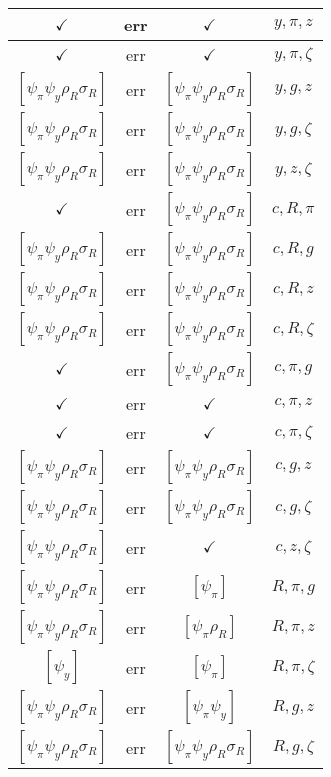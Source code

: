 \documentclass[a4paper,10pt]{article}
\begin{document}
\begin{longtable}{|c|c|c|c|}
\hline
$\checkmark$ & err & $\checkmark$ & ${y},{\pi},{z}$ \\
\hline
$\checkmark$ & err & $\checkmark$ & ${y},{\pi},{\zeta}$ \\
\hline
$[\psi_\pi \psi_y \rho_R \sigma_R ]$ & err & $[\psi_\pi \psi_y \rho_R \sigma_R ]$ & ${y},{g},{z}$ \\
\hline
$[\psi_\pi \psi_y \rho_R \sigma_R ]$ & err & $[\psi_\pi \psi_y \rho_R \sigma_R ]$ & ${y},{g},{\zeta}$ \\
\hline
$[\psi_\pi \psi_y \rho_R \sigma_R ]$ & err & $[\psi_\pi \psi_y \rho_R \sigma_R ]$ & ${y},{z},{\zeta}$ \\
\hline
$\checkmark$ & err & $[\psi_\pi \psi_y \rho_R \sigma_R ]$ & ${c},{R},{\pi}$ \\
\hline
$[\psi_\pi \psi_y \rho_R \sigma_R ]$ & err & $[\psi_\pi \psi_y \rho_R \sigma_R ]$ & ${c},{R},{g}$ \\
\hline
$[\psi_\pi \psi_y \rho_R \sigma_R ]$ & err & $[\psi_\pi \psi_y \rho_R \sigma_R ]$ & ${c},{R},{z}$ \\
\hline
$[\psi_\pi \psi_y \rho_R \sigma_R ]$ & err & $[\psi_\pi \psi_y \rho_R \sigma_R ]$ & ${c},{R},{\zeta}$ \\
\hline
$\checkmark$ & err & $[\psi_\pi \psi_y \rho_R \sigma_R ]$ & ${c},{\pi},{g}$ \\
\hline
$\checkmark$ & err & $\checkmark$ & ${c},{\pi},{z}$ \\
\hline
$\checkmark$ & err & $\checkmark$ & ${c},{\pi},{\zeta}$ \\
\hline
$[\psi_\pi \psi_y \rho_R \sigma_R ]$ & err & $[\psi_\pi \psi_y \rho_R \sigma_R ]$ & ${c},{g},{z}$ \\
\hline
$[\psi_\pi \psi_y \rho_R \sigma_R ]$ & err & $[\psi_\pi \psi_y \rho_R \sigma_R ]$ & ${c},{g},{\zeta}$ \\
\hline
$[\psi_\pi \psi_y \rho_R \sigma_R ]$ & err & $\checkmark$ & ${c},{z},{\zeta}$ \\
\hline
$[\psi_\pi \psi_y \rho_R \sigma_R ]$ & err & $[\psi_\pi ]$ & ${R},{\pi},{g}$ \\
\hline
$[\psi_\pi \psi_y \rho_R \sigma_R ]$ & err & $[\psi_\pi \rho_R ]$ & ${R},{\pi},{z}$ \\
\hline
$[\psi_y ]$ & err & $[\psi_\pi ]$ & ${R},{\pi},{\zeta}$ \\
\hline
$[\psi_\pi \psi_y \rho_R \sigma_R ]$ & err & $[\psi_\pi \psi_y ]$ & ${R},{g},{z}$ \\
\hline
$[\psi_\pi \psi_y \rho_R \sigma_R ]$ & err & $[\psi_\pi \psi_y \rho_R \sigma_R ]$ & ${R},{g},{\zeta}$ \\

\end{longtable}
\end{document}
